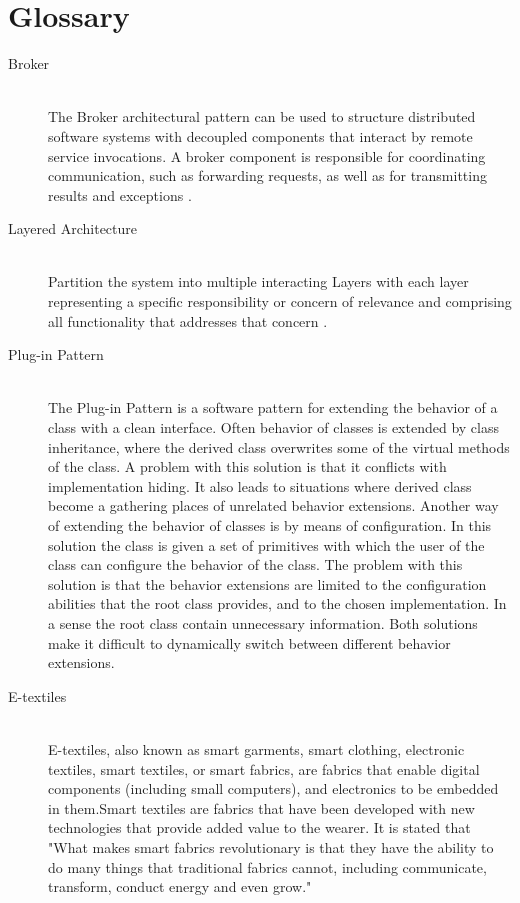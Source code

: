 \chapter{Glossary}
\begin{description}


\item[Broker] \hfill \\
 The Broker architectural pattern can be used to structure distributed software systems with decoupled components that interact by remote service invocations. A broker component is responsible for coordinating communication, such as forwarding requests, as well as for transmitting results and exceptions \cite{Buschmann}.
 

 
 \item[Layered Architecture] \hfill \\
  Partition the system into multiple interacting Layers with each layer
representing a specific responsibility or concern of relevance and
comprising all functionality that addresses that concern \cite{Buschmann}.
 
    
 
  \item[Plug-in Pattern] \hfill \\
  The Plug-in Pattern is a software pattern for extending the behavior of a class with a clean interface. Often behavior of classes is extended by class inheritance, where the derived class overwrites some of the virtual methods of the class. A problem with this solution is that it conflicts with implementation hiding. It also leads to situations where derived class become a gathering places of unrelated behavior extensions. Another way of extending the behavior of classes is by means of configuration. In this solution the class is given a set of primitives with which the user of the class can configure the behavior of the class. The problem with this solution is that the behavior extensions are limited to the configuration abilities that the root class provides, and to the chosen implementation. In a sense the root class contain unnecessary information. Both solutions make it difficult to dynamically switch between different behavior extensions.
  
 \item[E-textiles] \hfill \\
E-textiles, also known as smart garments, smart clothing, electronic textiles, smart textiles, or smart fabrics, are fabrics that enable digital components (including small computers), and electronics to be embedded in them.Smart textiles are fabrics that have been developed with new technologies that provide added value to the wearer. It is stated that "What makes smart fabrics revolutionary is that they have the ability to do many things that traditional fabrics cannot, including communicate, transform, conduct energy and even grow."
 

\end{description}
